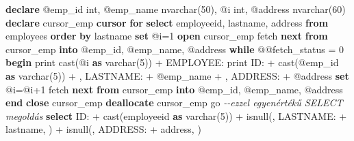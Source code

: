 \documentclass[
  magyar,
]{article}
\newenvironment{Shaded}{}{}
\newcommand{\CommentTok}[1]{\textcolor[rgb]{0.38,0.63,0.69}{\textit{#1}}}
\newcommand{\ControlFlowTok}[1]{\textcolor[rgb]{0.00,0.44,0.13}{\textbf{#1}}}
\newcommand{\DataTypeTok}[1]{\textcolor[rgb]{0.56,0.13,0.00}{#1}}
\newcommand{\DecValTok}[1]{\textcolor[rgb]{0.25,0.63,0.44}{#1}}
\newcommand{\FunctionTok}[1]{\textcolor[rgb]{0.02,0.16,0.49}{#1}}
\newcommand{\KeywordTok}[1]{\textcolor[rgb]{0.00,0.44,0.13}{\textbf{#1}}}
\newcommand{\NormalTok}[1]{#1}
\newcommand{\OperatorTok}[1]{\textcolor[rgb]{0.40,0.40,0.40}{#1}}
\newcommand{\StringTok}[1]{\textcolor[rgb]{0.25,0.44,0.63}{#1}}
\begin{document}
\begin{Shaded}
\begin{Highlighting}[]
\KeywordTok{declare}\NormalTok{ @emp\_id }\DataTypeTok{int}\NormalTok{, @emp\_name }\DataTypeTok{nvarchar}\NormalTok{(}\DecValTok{50}\NormalTok{), @i }\DataTypeTok{int}\NormalTok{, @address }\DataTypeTok{nvarchar}\NormalTok{(}\DecValTok{60}\NormalTok{)}
\KeywordTok{declare}\NormalTok{ cursor\_emp }\KeywordTok{cursor} \ControlFlowTok{for}
  \KeywordTok{select}\NormalTok{ employeeid, lastname, address }\KeywordTok{from}\NormalTok{ employees }\KeywordTok{order} \KeywordTok{by}\NormalTok{ lastname}
\KeywordTok{set}\NormalTok{ @i}\OperatorTok{=}\DecValTok{1}
\KeywordTok{open}\NormalTok{ cursor\_emp}
\NormalTok{fetch }\KeywordTok{next} \KeywordTok{from}\NormalTok{ cursor\_emp }\KeywordTok{into}\NormalTok{ @emp\_id, @emp\_name, @address}
\ControlFlowTok{while}\NormalTok{ @@fetch\_status }\OperatorTok{=} \DecValTok{0}
\ControlFlowTok{begin}
\NormalTok{  print }\FunctionTok{cast}\NormalTok{(@i }\KeywordTok{as} \DataTypeTok{varchar}\NormalTok{(}\DecValTok{5}\NormalTok{)) }\OperatorTok{+} \StringTok{\textquotesingle{} EMPLOYEE:\textquotesingle{}}
\NormalTok{  print }\StringTok{\textquotesingle{}ID: \textquotesingle{}} \OperatorTok{+} \FunctionTok{cast}\NormalTok{(@emp\_id }\KeywordTok{as} \DataTypeTok{varchar}\NormalTok{(}\DecValTok{5}\NormalTok{)) }\OperatorTok{+} \StringTok{\textquotesingle{}, LASTNAME: \textquotesingle{}} \OperatorTok{+}\NormalTok{ @emp\_name }\OperatorTok{+} \StringTok{\textquotesingle{}, ADDRESS: \textquotesingle{}} \OperatorTok{+}\NormalTok{ @address}
  \KeywordTok{set}\NormalTok{ @i}\OperatorTok{=}\NormalTok{@i}\OperatorTok{+}\DecValTok{1}
\NormalTok{  fetch }\KeywordTok{next} \KeywordTok{from}\NormalTok{ cursor\_emp }\KeywordTok{into}\NormalTok{ @emp\_id, @emp\_name, @address}
\ControlFlowTok{end}
\KeywordTok{close}\NormalTok{ cursor\_emp}
\KeywordTok{deallocate}\NormalTok{ cursor\_emp}
\NormalTok{go}
\CommentTok{{-}{-}ezzel egyenértékű SELECT megoldás}
\KeywordTok{select} \StringTok{\textquotesingle{}ID: \textquotesingle{}} \OperatorTok{+} \FunctionTok{cast}\NormalTok{(employeeid }\KeywordTok{as} \DataTypeTok{varchar}\NormalTok{(}\DecValTok{5}\NormalTok{)) }\OperatorTok{+}\NormalTok{ isnull(}\StringTok{\textquotesingle{}, LASTNAME: \textquotesingle{}} \OperatorTok{+}\NormalTok{ lastname, }\StringTok{\textquotesingle{}\textquotesingle{}}\NormalTok{) }\OperatorTok{+}
\NormalTok{isnull(}\StringTok{\textquotesingle{}, ADDRESS: \textquotesingle{}} \OperatorTok{+}\NormalTok{ address, }\StringTok{\textquotesingle{}\textquotesingle{}}\NormalTok{)}

\end{Highlighting}
\end{Shaded}
\end{document}
